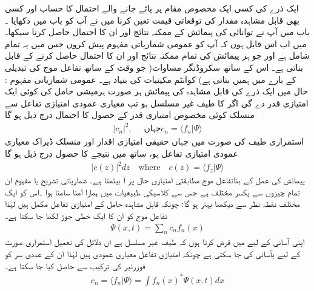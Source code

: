 %
ایک ذرے کی کسی ایک مخصوص مقام پر پائے جانے والے احتمال کا حساب اور کسی بھی قابل مشاہدہ مقدار کی توقعاتی قیمت تعین کرنا میں نے آپ کو باب  میں دکھایا ۔باب  میں آپ نے توانائی کی پیمائش کے ممکنہ نتائج اور ان کا احتمال حاصل کرنا سیکھا۔میں اب اس قابل ہوں کہ آپ کو عمومی شماریاتی مفہوم پیش کروں جس میں یہ تمام شامل ہے اور جو ہر پیمائش کی تمام ممکنہ نتائج اور ان کا احتمال حاصل کرنے کے قابل بناتی ہے۔ اس کے ساتھ سکروڈنگر مساوات( جو وقت کے ساتھ تفاعل موج کی تبدیلی کے بارے میں ہمیں بتاتی ہے) کوانٹم مکینیات کی بنیاد ہے۔
عمومی شماریاتی مفہوم : حال  میں ایک ذرے کی قابل مشاہدہ  کی پیمائش ہر صورت ہرمیشی حامل  کی کوئی ایک امتیازی قدر دے گی اگر  کا طیف غیر مسلسل ہو تب معیاری عمودی امتیازی تفاعل  سے منسلک کوئی مخصوص امتیازی قدر  کے حصول کا احتمال درج ذیل ہو گا 
\begin{align}
|c_{n}|^{2}, \quad \text{ جہاں} c_{n} = \langle f_{n}|\Psi \rangle
\end{align}
استمراری طیف کی صورت میں جہاں حقیقی امتیازی اقدار اور منسلک ڈیراک معیاری عمودی امتیازی تفاعل  ہو، ساتھ  میں نتیجے کا حصول درج ذیل ہو گا 
\begin{align}
|c(z)|^{2} dz \quad \text{where} \quad c(z) = \langle f_{z}|\Psi \rangle
\end{align}
پیمائش کی عمل کے بناتفاعل موج مطابقتی امتیازی حال پر آ بیٹھتا ہے۔
شماریاتی تشریح یا مفہوم ان تمام چیزوں سے یکسر مختلف ہے جس سے کلاسیکی طبیعیات میں ہمارا آمنا سامنا ہوا ۔اس کو ایک مختلف نقطہ نظر سے دیکھنا بہتر ہو گا: چونکہ قابل مشاہدہ حامل کے امتیازی تفاعل مکمل ہیں لہٰذا تفاعل موج کو ان کا ایک خطی جوڑ لکھا جا سکتا ہے۔
\begin{align}
\Psi(x,t) = \sum_{n} c_{n}f_{n}(x)
\end{align}
اپنی آسانی کے لیے میں فرض کرتا ہوں کہ طیف غیر مسلسل ہے ان دلائل کی تعمیل استمراری صورت کے لیے بآسانی کی جا سکتی ہے چونکہ امتیازی تفاعل معیاری عمودی ہیں لہٰذا ان کے عددی سر کو فوررئیر کی ترکیب سے حاصل کیا جا سکتا ہے۔
\begin{align}
c_{n} = \langle f_{n} | \Psi \rangle = \int f_{n}(x)^{*} \Psi(x,t)dx
\end{align}

